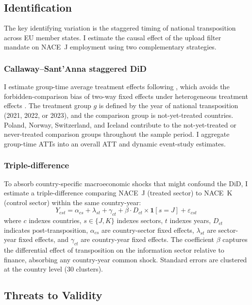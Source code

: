 \documentclass[12pt]{article}
\begin{document}
\subsection{Identification}

The key identifying variation is the staggered timing of national transposition across EU member states. I estimate the causal effect of the upload filter mandate on NACE~J employment using two complementary strategies.

\subsubsection*{Callaway--Sant'Anna staggered DiD}  I estimate group-time average treatment effects following \citet{callaway2021difference}, which avoids the forbidden-comparison bias of two-way fixed effects under heterogeneous treatment effects \citep{goodman2021difference, sun2021estimating}. The treatment group $g$ is defined by the year of national transposition (2021, 2022, or 2023), and the comparison group is not-yet-treated countries. Poland, Norway, Switzerland, and Iceland contribute to the not-yet-treated or never-treated comparison groups throughout the sample period. I aggregate group-time ATTs into an overall ATT and dynamic event-study estimates.

\subsubsection*{Triple-difference}  To absorb country-specific macroeconomic shocks that might confound the DiD, I estimate a triple-difference comparing NACE~J (treated sector) to NACE~K (control sector) within the same country-year:
\begin{equation}
Y_{cst} = \alpha_{cs} + \lambda_{st} + \gamma_{ct} + \beta \cdot D_{ct} \times \mathbf{1}[s = J] + \varepsilon_{cst}
\label{eq:ddd}
\end{equation}
where $c$ indexes countries, $s \in \{J, K\}$ indexes sectors, $t$ indexes years, $D_{ct}$ indicates post-transposition, $\alpha_{cs}$ are country-sector fixed effects, $\lambda_{st}$ are sector-year fixed effects, and $\gamma_{ct}$ are country-year fixed effects. The coefficient $\beta$ captures the differential effect of transposition on the information sector relative to finance, absorbing any country-year common shock. Standard errors are clustered at the country level (30 clusters).

\subsection{Threats to Validity}
\end{document}
